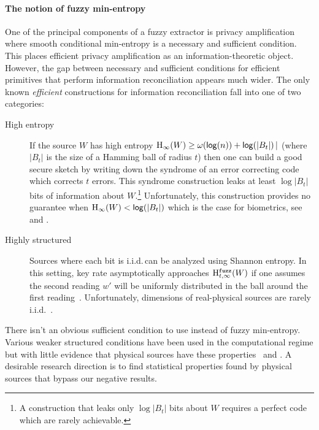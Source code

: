 \paragraph{The notion of fuzzy min-entropy}
One of the principal components of a fuzzy extractor is privacy amplification where smooth conditional min-entropy is a necessary and sufficient condition.  This places efficient privacy amplification as an information-theoretic object.  However, the gap between necessary and sufficient conditions for efficient primitives that perform information reconciliation appears much wider. The only known \emph{efficient} constructions for information reconciliation fall into one of two categories:
\begin{description}
\item[High entropy] If the source $W$ has high entropy $\mathrm{H}_\infty(W)\ge \omega(\mathsf{log}\!\left(n\right)) + \mathsf{log}\!\left(|B_t|\right)|$ (where $|B_t|$ is the size of a Hamming ball of radius $t$) then one can build a good secure sketch by writing down the syndrome of an error correcting code which corrects $t$ errors.  This syndrome construction  leaks at least $\log{|B_t|}$ bits of information about $W$.\footnote{A construction that leaks only $\log{|B_t|}$ bits about $W$ requires a perfect code which are rarely achievable.}  Unfortunately, this construction provides no guarantee when $\mathrm{H}_\infty(W)< \mathsf{log}\!\left(|B_t|\right)$ which is the case for biometrics, see \cite[Proposition 1]{canetti2021reusable} and \cite[Introduction]{simhadri2019cryptographic}.
\item[Highly structured] Sources where each bit is i.i.d.\,can be analyzed using Shannon entropy.  In this setting, key rate asymptotically approaches $\mathrm{H}^{\mathtt{fuzz}}_{t,\infty}(W)$ if one assumes the second reading $w'$ will be uniformly distributed in the ball around the first reading~\cite[Theorem 2]{tuyls2004capacity}.  Unfortunately, dimensions of real-physical sources are rarely i.i.d.~\cite{daugman2004}.
\end{description}

There isn't an obvious sufficient condition to use instead of fuzzy min-entropy.  Various weaker structured conditions have been used in the computational regime but with little evidence that physical sources have these properties~\cite[Figure 1]{demarest2021code} and \cite{simhadri2019cryptographic}. A desirable research direction is to find statistical properties found by physical sources that bypass our negative results. 

